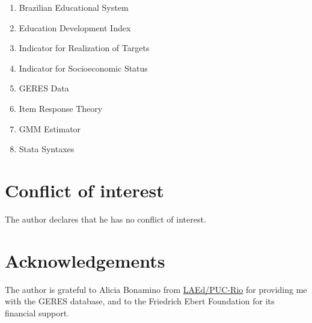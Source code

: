 \documentclass[a4paper, 12pt]{article}
\begin{document}
\begin{enumerate}
\item Brazilian Educational System
\vspace{-0.2cm} \item Education Development Index
\vspace{-0.2cm} \item Indicator for Realization of Targets
\vspace{-0.2cm} \item Indicator for Socioeconomic Status
\vspace{-0.2cm} \item GERES Data
\vspace{-0.2cm} \item Item Response Theory
\vspace{-0.2cm} \item GMM Estimator
\vspace{-0.2cm} \item Stata Syntaxes
\end{enumerate}





\section*{Conflict of interest}
The author declares that he has no conflict of interest.


\section*{Acknowledgements}
The author is grateful to Alicia Bonamino from \href{https://laedpucrio.wordpress.com/}{LAEd/PUC-Rio} for providing me with the GERES database, and to the Friedrich Ebert Foundation for its financial support.





\newpage




\newpage
\appendix




\setcounter{table}{0}
\renewcommand{\thetable}{A\arabic{table}}

\setcounter{figure}{0}
\renewcommand{\thefigure}{A\arabic{figure}}
\end{document}
